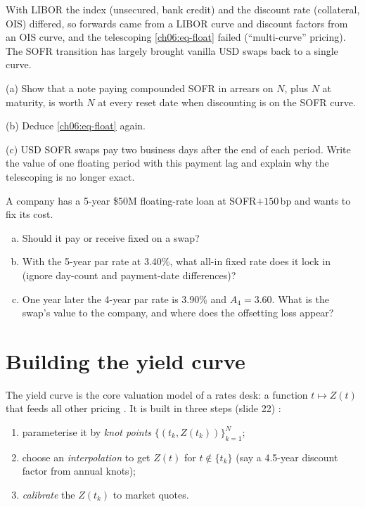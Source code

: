 \begin{paracol}{2}
\begin{remark}
With LIBOR the index (unsecured, bank credit) and the discount rate (collateral, OIS) differed, so forwards came
from a LIBOR curve and discount factors from an OIS curve, and the telescoping \eqref{ch06:eq-float} failed
(``multi-curve'' pricing). The SOFR transition has largely brought vanilla USD swaps back to a single curve.
\end{remark}

\begin{exercise}
(a) Show that a note paying compounded SOFR in arrears on $N$,
plus $N$ at maturity, is worth $N$ at every reset date when
discounting is on the SOFR curve.

(b) Deduce \eqref{ch06:eq-float} again.

(c) USD SOFR swaps pay two business days after the end of each
period. Write the value of one floating period with this payment
lag and explain why the telescoping is no longer exact.
\end{exercise}

\bigskip

\begin{exercise}
A company has a 5-year \$50M floating-rate loan at
SOFR$+150$\,bp and wants to fix its cost.
\begin{enumerate}[(a)]
  \item Should it pay or receive fixed on a swap?
  \item With the 5-year par rate at 3.40\%, what all-in fixed
      rate does it lock in (ignore day-count and payment-date
      differences)?
  \item One year later the 4-year par rate is 3.90\% and
      $A_4=3.60$. What is the swap's value to the company,
      and where does the offsetting loss appear?
\end{enumerate}
\end{exercise}

\section{Building the yield curve}\label{ch06:sec-curve}
The yield curve is the core valuation model of a rates desk: a function $t\mapsto Z(t)$ that feeds all other
pricing . It is built in three steps (slide 22) :
\begin{enumerate}[1.]
  \item parameterise it by \emph{knot points} $\{(t_k,Z(t_k))\}_{k=1}^{N}$;
  \item choose an \emph{interpolation} to get $Z(t)$ for $t\notin\{t_k\}$ (say a 4.5-year discount factor from
        annual knots);
  \item \emph{calibrate} the $Z(t_k)$ to market quotes.
\end{enumerate}


\end{paracol}
